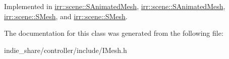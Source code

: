 Implemented in \hyperlink{structirr_1_1scene_1_1SAnimatedMesh_aefe38066b9c38c6d4ea522b5d988769e}{irr\+::scene\+::\+S\+Animated\+Mesh}, \hyperlink{structirr_1_1scene_1_1SAnimatedMesh_aefe38066b9c38c6d4ea522b5d988769e}{irr\+::scene\+::\+S\+Animated\+Mesh}, \hyperlink{structirr_1_1scene_1_1SMesh_a0ca30440aef6ca66dfc177b2a0e41e52}{irr\+::scene\+::\+S\+Mesh}, and \hyperlink{structirr_1_1scene_1_1SMesh_a0ca30440aef6ca66dfc177b2a0e41e52}{irr\+::scene\+::\+S\+Mesh}.



The documentation for this class was generated from the following file\+:\begin{DoxyCompactItemize}
\item 
indie\+\_\+share/controller/include/I\+Mesh.\+h\end{DoxyCompactItemize}

